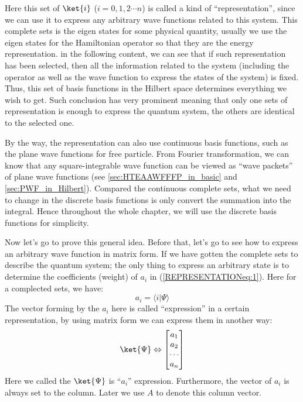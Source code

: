 Here this set of $\ket{i}$ ($i=0, 1, 2\cdots n$) is called a kind of
``representation'', since we can use it to express any arbitrary wave
functions related to this system. This complete sets is the eigen
states for some physical quantity, usually we use the eigen states for
the Hamiltonian operator so that they are the energy
representation. in the following content, we can see that if such
representation has been selected, then all the information related to
the system (including the operator as well as the wave function to
express the states of the system) is fixed. Thus, this set of basis
functions in the Hilbert space determines everything we wish to get.
Such conclusion has very prominent meaning that only one sets of
representation is enough to express the quantum system, the others are
identical to the selected one.

By the way, the representation can also use continuous basis
functions, such as the plane wave functions for free particle. From
Fourier transformation, we can know that any square-integrable wave
function can be viewed as ``wave packets'' of plane wave functions
(see \ref{sec:HTEAAWFFFP_in_basic} and \ref{sec:PWF_in_Hilbert}).
Compared the continuous complete sets, what we need to change in the
discrete basis functions is only convert the summation into the
integral. Hence throughout the whole chapter, we will use the
discrete basis functions for simplicity.

Now let's go to prove this general idea. Before that, let's go to
see how to express an arbitrary wave function in matrix form. If we
have gotten the complete sets to describe the quantum system; the
only thing to express an arbitrary state is to determine the
coefficients (weight) of $a_{i}$ in (\ref{REPRESENTATIONeq:1}). Here
for a complected sets, we have:
\begin{equation}\label{}
a_{i} = \langle i|\Psi\rangle
\end{equation}
The vector forming by the $a_{i}$ here is called ``expression'' in a
certain representation, by using matrix form we can express them in
another way:
\begin{equation}\label{REPRESENTATIONeq:2}
\ket{\Psi} \Leftrightarrow
\begin{bmatrix}
a_{1} \\
a_{2} \\
\cdots   \\
a_{n} \\
\end{bmatrix}
\end{equation}
Here we called the $\ket{\Psi}$ is ``$a_{i}$'' expression.
Furthermore, the vector of $a_{i}$ is always set to the column.
Later we use $A$ to denote this column vector.

